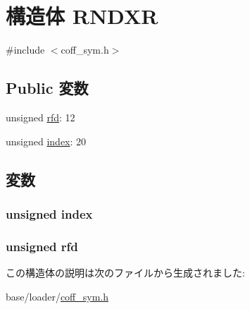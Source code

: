 \hypertarget{structRNDXR}{
\section{構造体 RNDXR}
\label{structRNDXR}
}


{\ttfamily \#include $<$coff\_\-sym.h$>$}\subsection*{Public 変数}
\begin{DoxyCompactItemize}
\item 
unsigned \hyperlink{structRNDXR_adba8730b45cc6c66e22e404a02ea84ee}{rfd}: 12
\item 
unsigned \hyperlink{structRNDXR_a360ebf6209d16512186ca7adb893abbb}{index}: 20
\end{DoxyCompactItemize}


\subsection{変数}
\hypertarget{structRNDXR_a360ebf6209d16512186ca7adb893abbb}{
\subsubsection[{index}]{\setlength{\rightskip}{0pt plus 5cm}unsigned {\bf index}}}
\label{structRNDXR_a360ebf6209d16512186ca7adb893abbb}
\hypertarget{structRNDXR_adba8730b45cc6c66e22e404a02ea84ee}{
\subsubsection[{rfd}]{\setlength{\rightskip}{0pt plus 5cm}unsigned {\bf rfd}}}
\label{structRNDXR_adba8730b45cc6c66e22e404a02ea84ee}


この構造体の説明は次のファイルから生成されました:\begin{DoxyCompactItemize}
\item 
base/loader/\hyperlink{coff__sym_8h}{coff\_\-sym.h}\end{DoxyCompactItemize}
